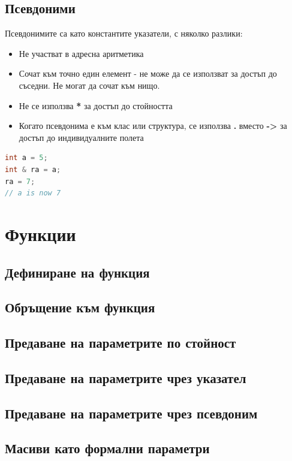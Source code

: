 \documentclass[fleqn,12pt]{article}
\begin{document}
\subsection{Псевдоними}
Псевдонимите са като константите указатели, с няколко разлики:
\begin{itemize}
    \item Не участват в адресна аритметика
    \item Сочат към точно един елемент - не може да се използват за достъп до съседни. Не могат да сочат към нищо.
    \item Не се използва \textbf{*} за достъп до стойността
    \item Когато псевдонима е към клас или структура, се използва \textbf{.} вместо \textbf{->} за достъп до индивидуалните полета
\end{itemize}

\begin{lstlisting}[language=C++, caption=Pointer example 2]
int a = 5;
int & ra = a;
ra = 7;
// a is now 7
\end{lstlisting}

\section{Функции}
\subsection{Дефиниране на функция}
\subsection{Обръщение към функция}
\subsection{Предаване на параметрите по стойност}
\subsection{Предаване на параметрите чрез указател}
\subsection{Предаване на параметрите чрез псевдоним}
\subsection{Масиви като формални параметри}
\end{document}
